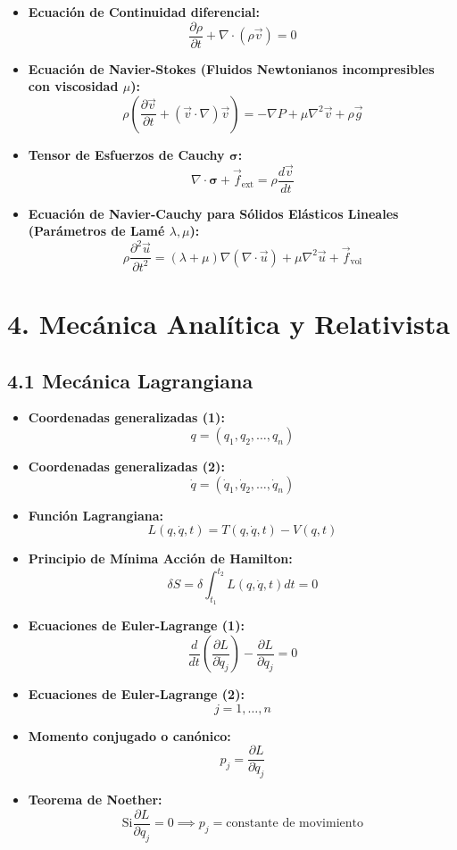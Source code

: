 \documentclass[11pt,a4paper]{article}
\begin{document}
\begin{itemize}
  \item \textbf{Ecuación de Continuidad diferencial:}
  \[
    \frac{\partial \rho}{\partial t} + \nabla \cdot (\rho \vec{v}) = 0
  \]
  \item \textbf{Ecuación de Navier-Stokes (Fluidos Newtonianos incompresibles con viscosidad $\mu$):}
  \[
    \rho \left( \frac{\partial \vec{v}}{\partial t} + (\vec{v} \cdot \nabla)\vec{v} \right) = -\nabla P + \mu \nabla^2 \vec{v} + \rho \vec{g}
  \]
  \item \textbf{Tensor de Esfuerzos de Cauchy $\boldsymbol{\sigma}$:}
  \[
    \nabla \cdot \boldsymbol{\sigma} + \vec{f}_{\mathrm{ext}} = \rho \frac{d\vec{v}}{dt}
  \]
  \item \textbf{Ecuación de Navier-Cauchy para Sólidos Elásticos Lineales (Parámetros de Lamé $\lambda, \mu$):}
  \[
    \rho \frac{\partial^2 \vec{u}}{\partial t^2} = (\lambda + \mu)\nabla(\nabla \cdot \vec{u}) + \mu \nabla^2 \vec{u} + \vec{f}_{\mathrm{vol}}
  \]
\end{itemize}

\section*{4. Mecánica Analítica y Relativista}

\subsection*{4.1 Mecánica Lagrangiana}

\begin{itemize}
  \item \textbf{Coordenadas generalizadas (1):}
  \[
    q = (q_1, q_2, \dots, q_n)
  \]
  \item \textbf{Coordenadas generalizadas (2):}
  \[
    \dot{q} = (\dot{q}_1, \dot{q}_2, \dots, \dot{q}_n)
  \]
  \item \textbf{Función Lagrangiana:}
  \[
    L(q, \dot{q}, t) = T(q, \dot{q}, t) - V(q, t)
  \]
  \item \textbf{Principio de Mínima Acción de Hamilton:}
  \[
    \delta S = \delta \int_{t_1}^{t_2} L(q, \dot{q}, t) dt = 0
  \]
  \item \textbf{Ecuaciones de Euler-Lagrange (1):}
  \[
    \frac{d}{dt}\left( \frac{\partial L}{\partial \dot{q}_j} \right) - \frac{\partial L}{\partial q_j} = 0
  \]
  \item \textbf{Ecuaciones de Euler-Lagrange (2):}
  \[
    j = 1, \dots, n
  \]
  \item \textbf{Momento conjugado o canónico:}
  \[
    p_j = \frac{\partial L}{\partial \dot{q}_j}
  \]
  \item \textbf{Teorema de Noether:}
  \[
    \mathrm{Si } \frac{\partial L}{\partial q_j} = 0 \implies p_j = \text{constante de movimiento}
  \]
\end{itemize}
\end{document}
